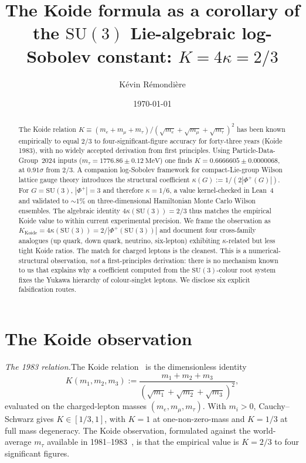 \documentclass[aps,prl,reprint,amsmath,amssymb,nofootinbib,floatfix,superscriptaddress]{revtex4-2}
\newcommand{\SU}{\mathrm{SU}}
\newcommand{\Phiroots}{\Phi^{+}}
\begin{document}
\title{The Koide formula as a corollary of the $\SU(3)$ Lie-algebraic log-Sobolev constant: $K = 4\kappa = 2/3$}

\author{K\'evin R\'emondi\`ere}

\date{\today}

\begin{abstract}
The Koide relation $K \equiv (m_e + m_\mu + m_\tau)/(\sqrt{m_e}+\sqrt{m_\mu}+\sqrt{m_\tau})^2$ has been known empirically to equal $2/3$ to four-significant-figure accuracy for forty-three years (Koide 1983), with no widely accepted derivation from first principles. Using Particle-Data-Group~2024 inputs ($m_\tau = 1776.86 \pm 0.12~\mathrm{MeV}$) one finds $K = 0.6666605 \pm 0.0000068$, at $0.91\sigma$ from $2/3$. A companion log-Sobolev framework for compact-Lie-group Wilson lattice gauge theory introduces the structural coefficient $\kappa(G) := 1/(2|\Phiroots(G)|)$. For $G = \SU(3)$, $|\Phiroots| = 3$ and therefore $\kappa = 1/6$, a value kernel-checked in Lean~4 and validated to ${\sim}1\%$ on three-dimensional Hamiltonian Monte Carlo Wilson ensembles. The algebraic identity $4\kappa(\SU(3)) = 2/3$ thus matches the empirical Koide value to within current experimental precision. We frame the observation as $K_{\mathrm{Koide}} = 4\kappa(\SU(3)) = 2/|\Phiroots(\SU(3))|$ and document four cross-family analogues (up quark, down quark, neutrino, six-lepton) exhibiting $\kappa$-related but less tight Koide ratios. The match for charged leptons is the cleanest. This is a numerical-structural observation, \emph{not} a first-principles derivation: there is no mechanism known to us that explains why a coefficient computed from the $\SU(3)$-colour root system fixes the Yukawa hierarchy of colour-singlet leptons. We disclose six explicit falsification routes.
\end{abstract}

\maketitle

\section{The Koide observation}
\label{sec:koide}

\textit{The 1983 relation.}\quad The Koide relation~\cite{Koide1983} is the dimensionless identity
\begin{equation}
K(m_1, m_2, m_3) := \frac{m_1 + m_2 + m_3}{(\sqrt{m_1} + \sqrt{m_2} + \sqrt{m_3})^2},
\label{eq:koide-def}
\end{equation}
evaluated on the charged-lepton masses $(m_e, m_\mu, m_\tau)$. With $m_i > 0$, Cauchy--Schwarz gives $K \in [1/3, 1]$, with $K = 1$ at one-non-zero-mass and $K = 1/3$ at full mass degeneracy. The Koide observation, formulated against the world-average $m_\tau$ available in 1981--1983~\cite{Koide1983}, is that the empirical value is $K = 2/3$ to four significant figures.
\end{document}
